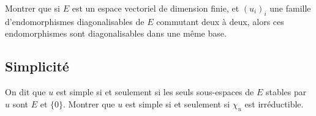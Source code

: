 \begin{exer}
Montrer que si $E$ est un espace vectoriel de dimension finie, %
et $(u_i)_i$ une famille d'endomorphismes diagonalisables de $E$ commutant deux à deux, %
alors ces endomorphismes sont diagonalisables dans une même base.
\end{exer}

\subsection{Simplicité}

\begin{exer}
On dit que $u$ est simple si et seulement si les seuls sous-espaces de $E$ stables par $u$ sont $E$ et $\{ 0\}$.
Montrer que $u$ est simple si et seulement si $\chi_u$ est irréductible.
\end{exer}